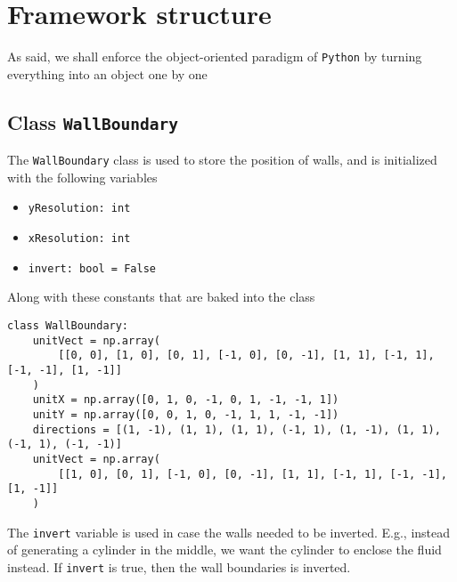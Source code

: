 \chapter{Framework structure}
\label{sec:model-structure}

As said, we shall enforce the object-oriented paradigm of \texttt{Python} by turning everything into an object one by one

\section[Class: wall boundary condition]{Class \texttt{WallBoundary}}
\label{sec:class-wall-boundary}

The \texttt{WallBoundary} class is used to store the position of walls, and is initialized with the following variables
\begin{itemize}[noitemsep]
	\item \texttt{yResolution: int}
	\item \texttt{xResolution: int}
	\item \texttt{invert: bool = False}
\end{itemize}
Along with these constants that are baked into the class
\begin{verbatim}
class WallBoundary:
    unitVect = np.array(
        [[0, 0], [1, 0], [0, 1], [-1, 0], [0, -1], [1, 1], [-1, 1], [-1, -1], [1, -1]]
    )
    unitX = np.array([0, 1, 0, -1, 0, 1, -1, -1, 1])
    unitY = np.array([0, 0, 1, 0, -1, 1, 1, -1, -1])
    directions = [(1, -1), (1, 1), (1, 1), (-1, 1), (1, -1), (1, 1), (-1, 1), (-1, -1)]
    unitVect = np.array(
        [[1, 0], [0, 1], [-1, 0], [0, -1], [1, 1], [-1, 1], [-1, -1], [1, -1]]
    )
\end{verbatim}

The \texttt{invert} variable is used in case the walls needed to be inverted. E.g., instead of generating a cylinder in the middle, we want the cylinder to enclose the fluid instead. If \texttt{invert} is true, then the wall boundaries is inverted.

